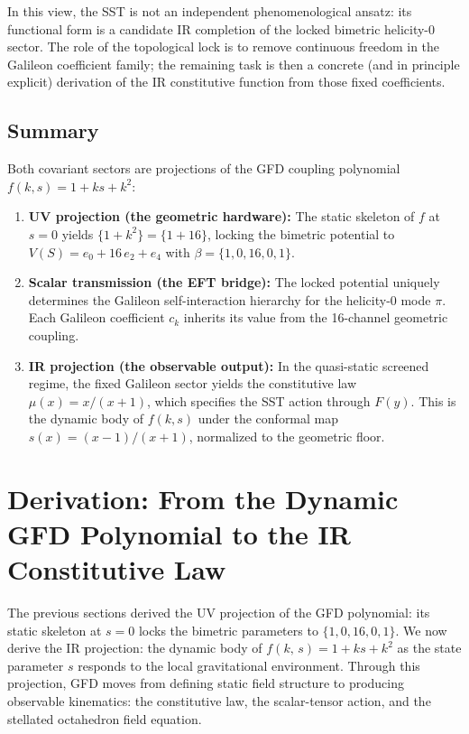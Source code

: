 \documentclass[twocolumn]{iopjournal}
\begin{document}
In this view, the SST is not an independent phenomenological ansatz: its functional form is a candidate IR completion of the locked bimetric helicity-0 sector. The role of the topological lock is to remove continuous freedom in the Galileon coefficient family; the remaining task is then a concrete (and in principle explicit) derivation of the IR constitutive function from those fixed coefficients.

\subsection*{Summary}
Both covariant sectors are projections of the GFD coupling polynomial $f(k,s) = 1 + ks + k^2$:
\begin{enumerate}
\item \textbf{UV projection (the geometric hardware):} The static skeleton of $f$ at $s = 0$ yields $\{1 + k^2\} = \{1 + 16\}$, locking the bimetric potential to $V(S) = e_0 + 16\,e_2 + e_4$ with $\beta = \{1,0,16,0,1\}$.
\item \textbf{Scalar transmission (the EFT bridge):} The locked potential uniquely determines the Galileon self-interaction hierarchy for the helicity-0 mode $\pi$. Each Galileon coefficient $c_k$ inherits its value from the 16-channel geometric coupling.
\item \textbf{IR projection (the observable output):} In the quasi-static screened regime, the fixed Galileon sector yields the constitutive law $\mu(x) = x/(x+1)$, which specifies the SST action through $F(y)$. This is the dynamic body of $f(k,s)$ under the conformal map $s(x) = (x-1)/(x+1)$, normalized to the geometric floor.
\end{enumerate}


\section*{Derivation: From the Dynamic GFD Polynomial to the IR Constitutive Law}

The previous sections derived the UV projection of the GFD polynomial: its static skeleton at $s = 0$ locks the bimetric parameters to $\{1, 0, 16, 0, 1\}$. We now derive the IR projection: the dynamic body of $f(k,\, s) = 1 + ks + k^2$ as the state parameter $s$ responds to the local gravitational environment. Through this projection, GFD moves from defining static field structure to producing observable kinematics: the constitutive law, the scalar-tensor action, and the stellated octahedron field equation.
\end{document}
